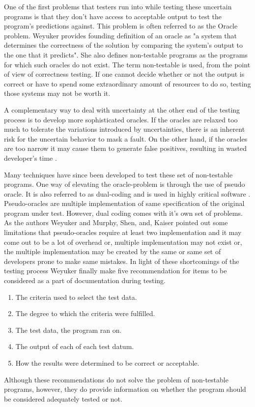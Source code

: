  One of the first problems that testers run into while testing these uncertain programs is that they don't have access to acceptable output to test the program's predictions against. This problem is often referred to as the Oracle problem. Weyuker \cite{Weyuker} provides founding definition of an oracle as "a system that determines the correctness of the solution by comparing the system's output to the one that it predicts". She also defines non-testable programs as the programs for which such oracles do not exist. The term non-testable is used, from the point of view of correctness testing. If one cannot decide whether or not the output is correct or have to spend some extraordinary amount of resources to do so, testing those systems may not be worth it.
 
 A complementary way to deal with uncertainty at the other end of the testing process is to develop more sophisticated oracles. If the oracles are relaxed too much to tolerate the variations introduced by uncertainties, there is an inherent risk for the uncertain behavior to mask a fault. On the other hand, if the oracles are too narrow it may cause them to generate false positives, resulting in wasted developer's time \cite{Elbaum2014}.
 
 Many techniques have since been developed to test these set of non-testable programs. One way of elevating the oracle-problem is through the use of pseudo oracle. It is also referred to as dual-coding and is used in highly critical software \cite{Weyuker,Murphy2009}. Pseudo-oracles are multiple implementation of same specification of the original program under test.
 However, dual coding comes with it's own set of problems. As the authors Weyuker \cite{Weyuker} and Murphy, Shen, and, Kaiser \cite{Murphy2009} pointed out some limitations that pseudo-oracles require at least two implementation and it may come out to be a lot of overhead or, multiple implementation may not exist or, the multiple implementation may be created by the same or same set of developers prone to make same mistakes.
 In light of these shortcomings of the testing process Weyuker \cite{Weyuker} finally make five recommendation for items to be considered as a part of documentation during testing.
\begin{enumerate}
  \item The criteria used to select the test data.
  \item The degree to which the criteria were fulfilled.
  \item The test data, the program ran on.
  \item The output of each of each test datum.
  \item How the results were determined to be correct or acceptable.
\end{enumerate}
Although these recommendations do not solve the problem of non-testable programs, however, they do provide information on whether the program should be considered adequately tested or not.


